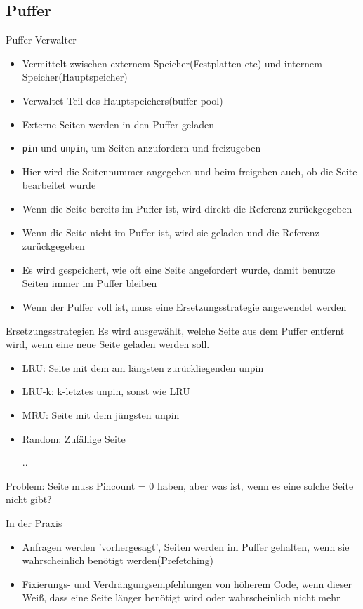 \documentclass{article}
\begin{document}
\subsection*{Puffer}
\begin{block}{Puffer-Verwalter}
  \begin{itemize}
    \item Vermittelt zwischen externem Speicher(Festplatten etc) und internem Speicher(Hauptspeicher)
    \item Verwaltet Teil des Hauptspeichers(buffer pool)
    \item Externe Seiten werden in den Puffer geladen
    \item \texttt{pin} und \texttt{unpin}, um Seiten anzufordern und freizugeben
    \item Hier wird die Seitennummer angegeben und beim freigeben auch, ob die Seite bearbeitet wurde
    \item Wenn die Seite bereits im Puffer ist, wird direkt die Referenz zurückgegeben
    \item Wenn die Seite nicht im Puffer ist, wird sie geladen und die Referenz zurückgegeben
    \item Es wird gespeichert, wie oft eine Seite angefordert wurde, damit benutze Seiten immer im Puffer bleiben
    \item Wenn der Puffer voll ist, muss eine Ersetzungsstrategie angewendet werden
  \end{itemize}
\end{block}

\begin{block}{Ersetzungsstrategien}
  Es wird ausgewählt, welche Seite aus dem Puffer entfernt wird, wenn eine neue Seite geladen werden soll.
  \begin{itemize}
    \item LRU: Seite mit dem am längsten zurückliegenden unpin
    \item LRU-k: k-letztes unpin, sonst wie LRU
    \item MRU: Seite mit dem jüngsten unpin
    \item Random: Zufällige Seite
    \item [..]
  \end{itemize}
  Problem: Seite muss Pincount = 0 haben, aber was ist, wenn es eine solche Seite nicht gibt?
\end{block}

\begin{block}{In der Praxis}
  \begin{itemize}
    \item Anfragen werden 'vorhergesagt', Seiten werden im Puffer gehalten, wenn sie wahrscheinlich benötigt werden(Prefetching)
    \item Fixierungs- und Verdrängungsempfehlungen von höherem Code, wenn dieser Weiß, dass eine Seite länger benötigt wird oder wahrscheinlich nicht mehr
  \end{itemize}
\end{block}
\end{document}
